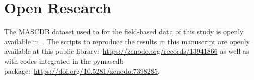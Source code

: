 \documentclass[draft]{agujournal2019}
\begin{document}
\section{Open Research}
The MASCDB dataset used to for the field-based data of this study is openly available in~. The scripts to reproduce the results in this manuscript are openly available at this public library:~\url{https://zenodo.org/records/13941866} as well as with codes integrated in the pymascdb package:~\url{https://doi.org/10.5281/zenodo.7398285}.












%
%



%
%
%
%
\end{document}
